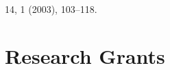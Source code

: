 \documentclass{article}
\begin{document}
\begin{enumerate}
{    14}, 1 (2003), 103--118.
\end{enumerate}



\section{Research Grants}
\end{document}

